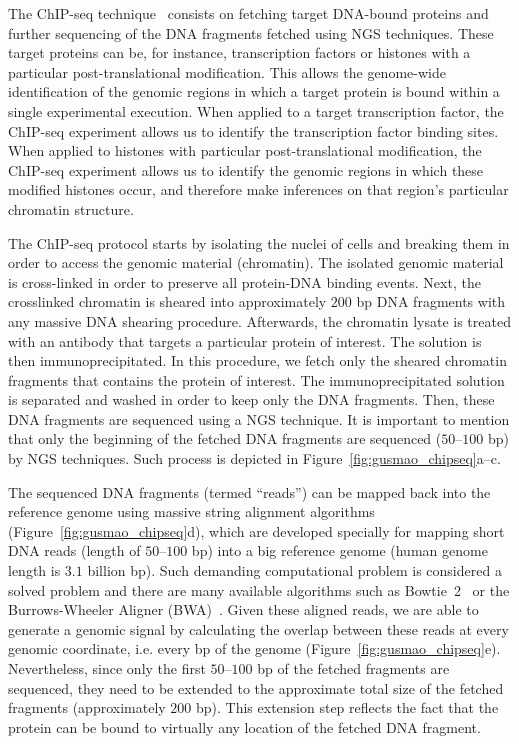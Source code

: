 The ChIP-seq technique~\cite{johnson2007} consists on fetching target DNA-bound proteins and further sequencing of the DNA fragments fetched using NGS techniques. These target proteins can be, for instance, transcription factors or histones with a particular post-translational modification. This allows the genome-wide identification of the genomic regions in which a target protein is bound within a single experimental execution. When applied to a target transcription factor, the ChIP-seq experiment allows us to identify the transcription factor binding sites. When applied to histones with particular post-translational modification, the ChIP-seq experiment allows us to identify the genomic regions in which these modified histones occur, and therefore make inferences on that region's particular chromatin structure.

The ChIP-seq protocol starts by isolating the nuclei of cells and breaking them in order to access the genomic material (chromatin). The isolated genomic material is cross-linked in order to preserve all protein-DNA binding events. Next, the crosslinked chromatin is sheared into approximately $200$ bp DNA fragments with any massive DNA shearing procedure. Afterwards, the chromatin lysate is treated with an antibody that targets a particular protein of interest. The solution is then immunoprecipitated. In this procedure, we fetch only the sheared chromatin fragments that contains the protein of interest. The immunoprecipitated solution is separated and washed in order to keep only the DNA fragments. Then, these DNA fragments are sequenced using a NGS technique. It is important to mention that only the beginning of the fetched DNA fragments are sequenced ($50$--$100$ bp) by NGS techniques. Such process is depicted in Figure~\ref{fig:gusmao_chipseq}a--c.

The sequenced DNA fragments (termed ``reads'') can be mapped back into the reference genome using massive string alignment algorithms (Figure~\ref{fig:gusmao_chipseq}d), which are developed specially for mapping short DNA reads (length of $50$--$100$ bp) into a big reference genome (human genome length is \approxy$3.1$ billion bp). Such demanding computational problem is considered a solved problem and there are many available algorithms such as Bowtie~2~\cite{langmead2012} or the Burrows-Wheeler Aligner (BWA)~\cite{li2009b}. Given these aligned reads, we are able to generate a genomic signal by calculating the overlap between these reads at every genomic coordinate, i.e. every bp of the genome (Figure~\ref{fig:gusmao_chipseq}e). Nevertheless, since only the first $50$--$100$ bp of the fetched fragments are sequenced, they need to be extended to the approximate total size of the fetched fragments (approximately $200$ bp). This extension step reflects the fact that the protein can be bound to virtually any location of the fetched DNA fragment.

